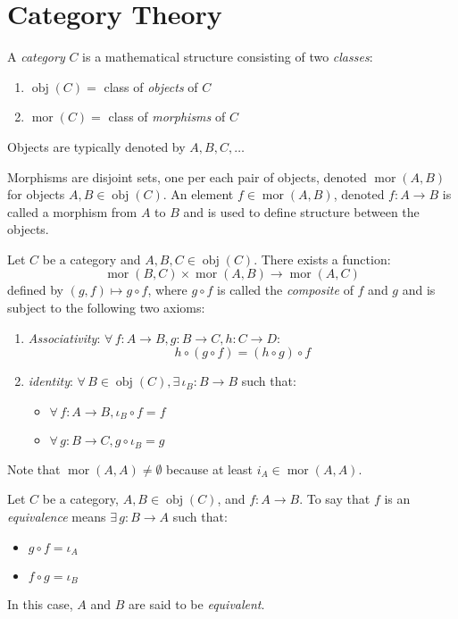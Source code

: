\documentclass[letterpaper,12pt,fleqn]{article}
\DeclareMathOperator{\obj}{obj}
\DeclareMathOperator{\mor}{mor}
\renewcommand{\i}{\iota}
\begin{document}
\section*{Category Theory}

\begin{definition}[Category]
  A \emph{category} $C$ is a mathematical structure consisting of two
  \emph{classes}:
  \begin{enumerate}
  \item $\obj(C)=$ class of \emph{objects} of $C$
  \item $\mor(C)=$ class of \emph{morphisms} of $C$
  \end{enumerate}
  Objects are typically denoted by $A,B,C,\ldots$

  Morphisms are disjoint sets, one per each pair of objects, denoted
  $\mor(A,B)$ for objects $A,B\in\obj(C)$. An element $f\in\mor(A,B)$,
  denoted $f:A\to B$ is called a morphism from $A$ to $B$ and is used to
  define structure between the objects.
\end{definition}

\begin{definition}[Composition]
  Let $C$ be a category and $A,B,C\in\obj(C)$. There exists a function:
  \[\mor(B,C)\times\mor(A,B)\to\mor(A,C)\]
  defined by $(g,f)\mapsto g\circ f$, where $g\circ f$ is called the
  \emph{composite} of $f$ and $g$ and is subject to the following two axioms:
  \begin{enumerate}
  \item \emph{Associativity}: $\forall\,f:A\to B,g:B\to C,h:C\to D$:
    \[h\circ(g\circ f)=(h\circ g)\circ f\]
  \item \emph{identity}: $\forall\,B\in\obj(C),\exists\,\i_B:B\to B$ such that:
    \begin{itemize}
    \item $\forall\,f:A\to B,\i_B\circ f=f$
    \item $\forall\,g:B\to C,g\circ \i_B=g$
    \end{itemize}
  \end{enumerate}
\end{definition}

Note that $\mor(A,A)\ne\emptyset$ because at least $i_A\in\mor(A,A)$.

\begin{definition}[Equivalence]
  Let $C$ be a category, $A,B\in\obj(C)$, and $f:A\to B$. To say that $f$ is an
  \emph{equivalence} means $\exists\,g:B\to A$ such that:
  \begin{itemize}
  \item $g\circ f=\i_A$
  \item $f\circ g=\i_B$
  \end{itemize}
  In this case, $A$ and $B$ are said to be \emph{equivalent}.
\end{definition}
\end{document}
